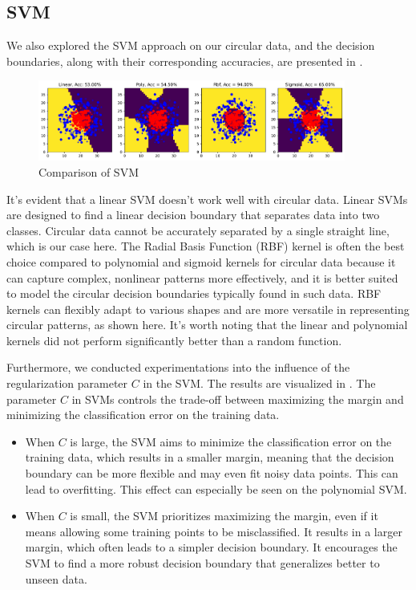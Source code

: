 \subsection{SVM}

We also explored the SVM approach on our circular data, and the decision boundaries, along with their corresponding accuracies, are presented in .

\begin{figure}[H]
    \centering
    \includegraphics[width=0.9\textwidth]{figs/NN/svm_comparison.pdf}
    \caption{Comparison of SVM}
    \label{fig:svm_comparison}
\end{figure}

It's evident that a linear SVM doesn't work well with circular data. Linear SVMs are designed to find a linear decision boundary that separates data into two classes. Circular data cannot be accurately separated by a single straight line, which is our case here. The Radial Basis Function (RBF) kernel is often the best choice compared to polynomial and sigmoid kernels for circular data because it can capture complex, nonlinear patterns more effectively, and it is better suited to model the circular decision boundaries typically found in such data. RBF kernels can flexibly adapt to various shapes and are more versatile in representing circular patterns, as shown here. It's worth noting that the linear and polynomial kernels did not perform significantly better than a random function.

Furthermore, we conducted experimentations into the influence of the regularization parameter $C$ in the SVM. The results are visualized in . The parameter $C$ in SVMs controls the trade-off between maximizing the margin and minimizing the classification error on the training data.

\begin{itemize}
    \item When $C$ is large, the SVM aims to minimize the classification error on the training data, which results in a smaller margin, meaning that the decision boundary can be more flexible and may even fit noisy data points. This can lead to overfitting. This effect can especially be seen on the polynomial SVM. 
    \item When $C$ is small, the SVM prioritizes maximizing the margin, even if it means allowing some training points to be misclassified. It results in a larger margin, which often leads to a simpler decision boundary. It encourages the SVM to find a more robust decision boundary that generalizes better to unseen data.
\end{itemize}

